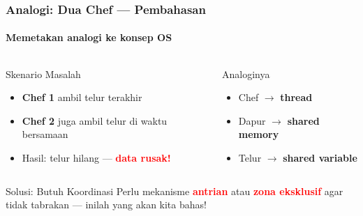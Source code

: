 \documentclass[t,aspectratio=169,xcolor=dvipsnames]{beamer}
\newcommand{\tem}[1]{\textbf{\textcolor{red}{#1}}}
\begin{document}
\begin{frame}
    \frametitle{Analogi: Dua Chef — Pembahasan}
    \framesubtitle{Memetakan analogi ke konsep OS}
    \small

    \begin{columns}[T]
        \begin{alertblock}{Skenario Masalah}
            \begin{itemize}
                \item \textbf{Chef 1} ambil telur terakhir
                \item \textbf{Chef 2} juga ambil telur di waktu bersamaan
                \item Hasil: telur hilang — \tem{data rusak!}
            \end{itemize}
        \end{alertblock}

        \begin{block}{Analoginya}
            \begin{itemize}
                \item Chef $\rightarrow$ \textbf{thread}
                \item Dapur $\rightarrow$ \textbf{shared memory}
                \item Telur $\rightarrow$ \textbf{shared variable}
            \end{itemize}
        \end{block}
    \end{columns}

    \vspace{0.3cm}
    \begin{exampleblock}{Solusi: Butuh Koordinasi}
        Perlu mekanisme \tem{antrian} atau \tem{zona eksklusif} agar tidak tabrakan — inilah yang akan kita bahas!
    \end{exampleblock}
\end{frame}
\end{document}
